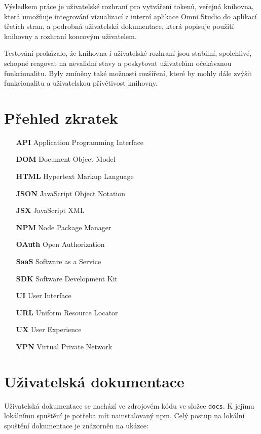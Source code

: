 \documentclass[czech, bc, kiv, he, iso690numb]{fasthesis}
\begin{document}
Výsledkem práce je uživatelské rozhraní pro vytváření tokenů, veřejná knihovna, která umožňuje integrování vizualizací z interní aplikace Omni Studio
do aplikací třetích stran, a podrobná uživatelská dokumentace, která popisuje použití knihovny a rozhraní koncovým uživatelem.

Testování prokázalo, že knihovna i uživatelské rozhraní jsou stabilní, spolehlivé, schopné reagovat na nevalidní stavy a poskytovat uživatelům očekávanou funkcionalitu. Byly zmíněny 
také možnosti rozšíření, které by mohly dále zvýšit funkcionalitu a uživatelskou přívětivost knihovny.

\chapter*{Přehled zkratek}

\begin{itemize}[align=left, labelwidth=1.5cm, labelsep=10pt, leftmargin=!]
    \item[\textbf{API}]    Application Programming Interface  
    \item[\textbf{DOM}] 	Document Object Model
    \item[\textbf{HTML}]  Hypertext Markup Language
    \item[\textbf{JSON}]  JavaScript Object Notation
    \item[\textbf{JSX}] JavaScript XML
    \item[\textbf{NPM}] Node Package Manager
    \item[\textbf{OAuth}] Open Authorization
    \item[\textbf{SaaS}]  Software as a Service
    \item[\textbf{SDK}]    Software Development Kit
    \item[\textbf{UI}]        User Interface
    \item[\textbf{URL}] Uniform Resource Locator
    \item[\textbf{UX}]        User Experience
    \item[\textbf{VPN}]        Virtual Private Network
\end{itemize}

\appendix
\chapter{Uživatelská dokumentace}\label{app:docuDocs}
Uživatelská dokumentace se nachází ve zdrojovém kódu ve složce \texttt{docs}. K jejímu lokálnímu spuštění je potřeba mít nainstalovaný npm.
Celý postup na lokální spuštění dokumentace je znázorněn na ukázce:
\end{document}
